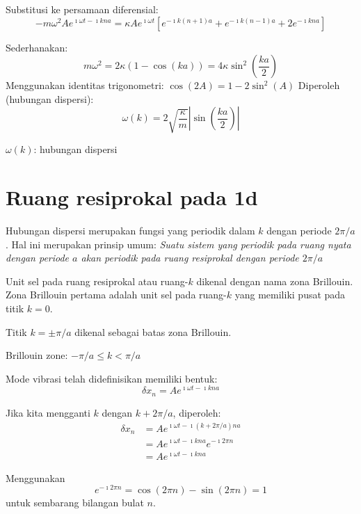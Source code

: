 Substitusi ke persamaan diferensial:
\begin{equation*}
-m\omega^2 A e^{\imath \omega t - \imath k n a} = 
\kappa A e^{\imath \omega t} \left[ 
e^{-\imath k (n+1) a} +
e^{-\imath k (n-1) a} +
2e^{-\imath k n a}
\right]
\end{equation*}

Sederhanakan:
\begin{equation*}
m\omega^2 = 2\kappa\left( 1 - \cos(ka) \right) = 4\kappa \sin^2 \left( \frac{ka}{2} \right)
\end{equation*}
Menggunakan identitas trigonometri: $\cos(2A) = 1 - 2\sin^2(A)$
Diperoleh (hubungan dispersi):
\begin{equation}
\omega(k) = 2\sqrt{\frac{\kappa}{m}} \left| \sin\left(\frac{ka}{2}\right) \right|
\end{equation}

$\omega(k)$: hubungan dispersi

\section{Ruang resiprokal pada 1d}

Hubungan dispersi merupakan fungsi yang periodik dalam \(k\) dengan
periode \(2\pi/a\). Hal ini merupakan prinsip umum: \emph{Suatu sistem
yang periodik pada ruang nyata dengan periode \(a\) akan periodik pada
ruang resiprokal dengan periode \(2\pi/a\)}

Unit sel pada ruang resiprokal atau ruang-\(k\) dikenal dengan nama zona
Brillouin. Zona Brillouin pertama adalah unit sel pada ruang-\(k\) yang
memiliki pusat pada titik \(k=0\).

Titik \(k=\pm \pi/a\) dikenal sebagai batas zona Brillouin.

Brillouin zone: $-\pi/a \leq k < \pi/a$

Mode vibrasi telah didefinisikan memiliki bentuk: \[
\delta x_{n} = A e^{\imath \omega t - \imath k n a}
\]

Jika kita mengganti \(k\) dengan \(k + 2\pi/a\), diperoleh:
\begin{align}
\delta x_{n} & = A e^{\imath \omega t - \imath (k + 2\pi/a) n a} \\
& = A e^{\imath \omega t - \imath k n a} e^{-\imath 2\pi n} \\
& = A e^{\imath \omega t - \imath k n a}
\end{align}


Menggunakan \[
e^{-\imath 2\pi n } = \cos(2\pi n) - \sin(2\pi n) = 1
\] untuk sembarang bilangan bulat \(n\).

